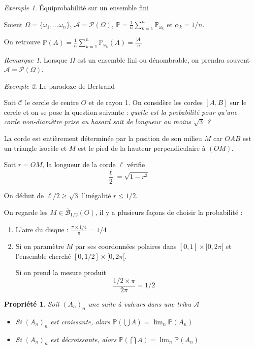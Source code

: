 \documentclass[]{article}
\newtheorem{myproperty}{Propriété}
\theoremstyle{remark}
\newtheorem{myrem}{Remarque}
\newtheorem{myexmpl}{Exemple}
\theoremstyle{definition}
\newcommand{\prob}[1]{\mathbb{P}\left(#1\right)}
\newcommand{\DS}{\displaystyle}
\begin{document}
\begin{myexmpl} Équiprobabilité sur un ensemble fini
	
	Soient $\Omega = \{\omega_1, ... \omega_n\}$, $\mathcal{A} = \mathcal{P}(\Omega)$, $\displaystyle \mathbb{P} = \frac{1}{n} \sum_{k = 1}^{n} \mathbb{P}_{\omega_k}$ et $\alpha_k = 1/n$.
	
	On retrouve $\displaystyle \prob{A} = \frac{1}{n} \sum_{k = 1}^{n} \mathbb{P}_{\omega_k}(A) = \frac{|A|}{n}$
\end{myexmpl}

\begin{myrem}
	Lorsque $\Omega$ est un ensemble fini ou dénombrable, on prendra souvent $\mathcal{A} = \mathcal{P}(\Omega)$.
\end{myrem}

\begin{myexmpl} Le paradoxe de Bertrand
	
	Soit $\mathcal{C}$ le cercle de centre $O$ et de rayon 1. On considère les cordes $[A, B]$ sur le cercle et on se pose la question suivante : \textit{quelle est la probabilité pour qu'une corde non-diamètre prise au hasard soit de longueur au moins $\sqrt{3}$ ?}
	
	La corde est entièrement déterminée par la position de son milieu $M$ car $OAB$ est un triangle isocèle et $M$ est le pied de la hauteur perpendiculaire à $(OM)$.
	
	Soit $r = OM$, la longueur de la corde $\ell$ vérifie $$\frac{\ell}{2} = \sqrt{1 - r^2}$$
	
	On déduit de $\ell/2 \geqslant \sqrt{3}$ l'inégalité $r \leqslant 1/2$.
	
	On regarde les $M \in \overline{\mathcal{B}}_{1/2}(O)$, il y a plusieurs façons de choisir la probabilité :
	\begin{enumerate}
		\item L'aire du disque : $\frac{\pi \times 1 / 4}{\pi} = 1/4$
		\item Si on paramètre $M$ par ses coordonnées polaires dans $[0, 1] \times [0, 2 \pi[$ et l'ensemble cherché $[0, 1/2] \times [0, 2 \pi[$.
		
		Si on prend la mesure produit $$\frac{1/2 \times \pi}{2 \pi} = 1/2$$
	\end{enumerate}
\end{myexmpl}

\begin{myproperty}
	Soit $(A_n)_n$ une suite à valeurs dans une tribu $\mathcal{A}$
	\begin{itemize}
		\item Si $(A_n)_n$ est croissante, alors $\DS \prob{\bigcup A} = \lim_n \prob{A_n}$
		\item Si $(A_n)_n$ est décroissante, alors $\DS \prob{\bigcap A} = \lim_n \prob{A_n}$
	\end{itemize}
\end{myproperty}
\end{document}
